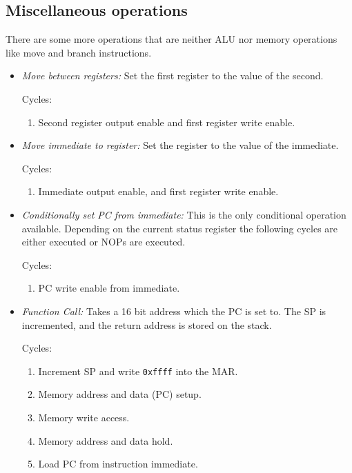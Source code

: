 \subsection{Miscellaneous operations}
There are some more operations that are neither \gls{ALU} nor memory operations like move and branch instructions.
\begin{itemize}
  \item \emph{Move between registers:} Set the first register to the value of the second.

  Cycles:
  \begin{enumerate}
    \item Second register output enable and first register write enable.
  \end{enumerate}

  \item \emph{Move immediate to register:} Set the register to the value of the immediate.

  Cycles:
  \begin{enumerate}
    \item Immediate output enable, and first register write enable.
  \end{enumerate}

  \item \emph{Conditionally set \gls{PC} from immediate:} This is the only conditional operation available.
  Depending on the current status register the following cycles are either executed or \glspl{NOP} are executed.

  Cycles:
  \begin{enumerate}
    \item \gls{PC} write enable from immediate.
  \end{enumerate}

  \item \emph{Function Call:} Takes a 16 bit address which the \gls{PC} is set to.
  The \gls{SP} is incremented, and the return address is stored on the stack.

  Cycles:
  \begin{enumerate}
    \item Increment \gls{SP} and write \texttt{0xffff} into the \gls{MAR}.
    \item Memory address and data (\gls{PC}) setup.
    \item Memory write access.
    \item Memory address and data hold.
    \item Load \gls{PC} from instruction immediate.
  \end{enumerate}


\end{itemize}
